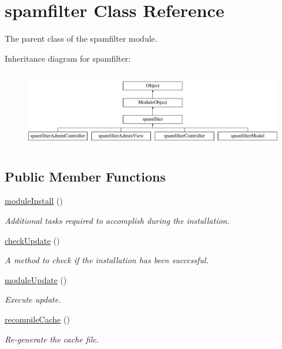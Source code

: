 \hypertarget{classspamfilter}{}\section{spamfilter Class Reference}
\label{classspamfilter}


The parent class of the spamfilter module.  


Inheritance diagram for spamfilter\+:\begin{figure}[H]
\begin{center}
\leavevmode
\includegraphics[height=3.393939cm]{classspamfilter}
\end{center}
\end{figure}
\subsection*{Public Member Functions}
\begin{DoxyCompactItemize}
\item 
\hyperlink{classspamfilter_a954acbd202a4fd956703c0b212589392}{module\+Install} ()
\begin{DoxyCompactList}\small\item\em Additional tasks required to accomplish during the installation. \end{DoxyCompactList}\item 
\hyperlink{classspamfilter_a4188af3ccfed17cb4da4a34f7931101e}{check\+Update} ()
\begin{DoxyCompactList}\small\item\em A method to check if the installation has been successful. \end{DoxyCompactList}\item 
\hyperlink{classspamfilter_ae3980ae505347671cd20e5de25448772}{module\+Update} ()
\begin{DoxyCompactList}\small\item\em Execute update. \end{DoxyCompactList}\item 
\hyperlink{classspamfilter_af660e435ce957c41e79a555110875960}{recompile\+Cache} ()
\begin{DoxyCompactList}\small\item\em Re-\/generate the cache file. \end{DoxyCompactList}\end{DoxyCompactItemize}
